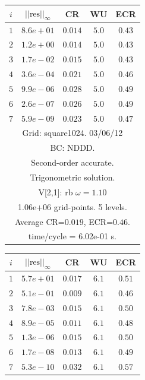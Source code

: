 \begin{table}[hbt]
\begin{center}
{\tablefontsize
\begin{tabular}{|c|c|c|c|c|} \hline 
 $i$   & $\vert\vert\mbox{res}\vert\vert_\infty$  &  CR     &  WU    & ECR  \\   \hline 
 $ 1$  & $ 8.6e+01$ & $0.014$ & $ 5.0$ & $0.43$ \\ 
 $ 2$  & $ 1.2e+00$ & $0.014$ & $ 5.0$ & $0.43$ \\ 
 $ 3$  & $ 1.7e-02$ & $0.015$ & $ 5.0$ & $0.43$ \\ 
 $ 4$  & $ 3.6e-04$ & $0.021$ & $ 5.0$ & $0.46$ \\ 
 $ 5$  & $ 9.9e-06$ & $0.028$ & $ 5.0$ & $0.49$ \\ 
 $ 6$  & $ 2.6e-07$ & $0.026$ & $ 5.0$ & $0.49$ \\ 
 $ 7$  & $ 5.9e-09$ & $0.023$ & $ 5.0$ & $0.47$ \\ 
\hline 
\multicolumn{5}{|c|}{Grid: square1024. 03/06/12}  \\
\multicolumn{5}{|c|}{BC: NDDD.}  \\
\multicolumn{5}{|c|}{Second-order accurate.}  \\
\multicolumn{5}{|c|}{Trigonometric solution.}  \\
\multicolumn{5}{|c|}{V[2,1]: rb $\omega=1.10$}  \\
\multicolumn{5}{|c|}{1.06e+06 grid-points. 5 levels.}  \\
\multicolumn{5}{|c|}{Average CR=$0.019$, ECR=$0.46$.}  \\
\multicolumn{5}{|c|}{time/cycle = 6.02e-01 s.}  \\
\hline 
\end{tabular}
\begin{tabular}{|c|c|c|c|c|} \hline 
 $i$   & $\vert\vert\mbox{res}\vert\vert_\infty$  &  CR     &  WU    & ECR  \\   \hline 
 $ 1$  & $ 5.7e+01$ & $0.017$ & $ 6.1$ & $0.51$ \\ 
 $ 2$  & $ 5.1e-01$ & $0.009$ & $ 6.1$ & $0.46$ \\ 
 $ 3$  & $ 7.8e-03$ & $0.015$ & $ 6.1$ & $0.50$ \\ 
 $ 4$  & $ 8.9e-05$ & $0.011$ & $ 6.1$ & $0.48$ \\ 
 $ 5$  & $ 1.3e-06$ & $0.015$ & $ 6.1$ & $0.50$ \\ 
 $ 6$  & $ 1.7e-08$ & $0.013$ & $ 6.1$ & $0.49$ \\ 
 $ 7$  & $ 5.3e-10$ & $0.032$ & $ 6.1$ & $0.57$ \\ 

\end{tabular}}
\end{center}
\end{table}
